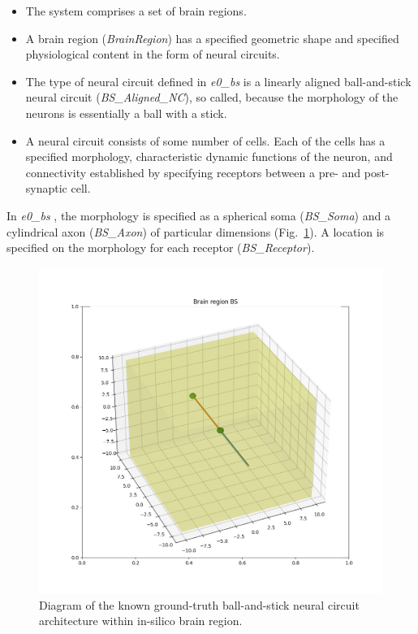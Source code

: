\documentclass{ldr-article}
\def\firstexp{\textit{e0\_bs} }
\begin{document}
\begin{itemize}
	\item The system comprises a set of brain regions.
	\item A brain region (\textit{BrainRegion}) has a specified geometric shape and specified physiological content in the form of neural circuits.
	\item The type of neural circuit defined in \firstexp is a linearly aligned ball-and-stick neural circuit (\textit{BS\_Aligned\_NC}), so called, because the morphology of the neurons is essentially a ball with a stick.
	\item A neural circuit consists of some number of cells. Each of the cells has a specified morphology, characteristic dynamic functions of the neuron, and connectivity established by specifying receptors between a pre- and post-synaptic cell.
\end{itemize}

In \firstexp, the morphology is specified as a spherical soma (\textit{BS\_Soma}) and a cylindrical axon (\textit{BS\_Axon}) of particular dimensions (Fig.~\ref{fig:KGT-architecture}). A location is specified on the morphology for each receptor (\textit{BS\_Receptor}).

\begin{figure}
	\centering
	\includegraphics[width=1\linewidth]{figures/e0_bs.png}
	\caption{Diagram of the known ground-truth ball-and-stick neural circuit architecture within in-silico brain region.
	}
	\label{fig:KGT-architecture}
\end{figure}
\end{document}
